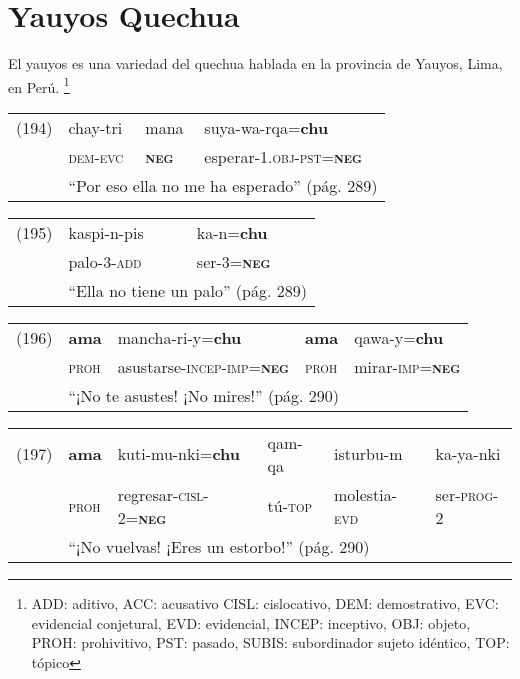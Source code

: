 \section*{Yauyos Quechua}

\noindent El yauyos es una variedad del quechua hablada en la provincia de Yauyos, Lima, en Perú.
\footnote{ADD: aditivo, ACC: acusativo CISL: cislocativo, DEM: demostrativo, EVC: evidencial conjetural, EVD: evidencial, INCEP: inceptivo, OBJ: objeto, PROH: prohivitivo, PST: pasado, SUBIS: subordinador sujeto idéntico, TOP: tópico}
\vspace{0.1cm}

{\setmainfont{Charis SIL}

\noindent \begin{tabular}{llll}
(194) & chay-tri & mana & suya-wa-rqa=\textbf{chu} \\
& \textsc{dem-evc} & \textsc{\textbf{neg}} & esperar-\textsc{1.obj-pst=\textbf{neg}} \\
& \multicolumn{3}{l}{``Por eso ella no me ha esperado'' (pág. 289)}
\end{tabular} \vspace{0.1cm}

\noindent \begin{tabular}{lll}
(195) & kaspi-n-pis & ka-n=\textbf{chu} \\
& palo-\textsc{3-add} & ser-\textsc{3=\textbf{neg}}\\
& \multicolumn{2}{l}{``Ella no tiene un palo'' (pág. 289)}
\end{tabular} \vspace{0.1cm}

\noindent \begin{tabular}{lllll}
(196) & \textbf{ama} & mancha-ri-y=\textbf{chu} & \textbf{ama} & qawa-y=\textbf{chu} \\
& \textsc{proh} & asustarse-\textsc{incep-imp=\textbf{neg}} & \textsc{proh} & mirar-\textsc{imp=\textbf{neg}} \\
& \multicolumn{4}{l}{``¡No te asustes! ¡No mires!'' (pág. 290)}
\end{tabular} \vspace{0.1cm}

\noindent \begin{tabular}{llllll}
(197) & \textbf{ama} & kuti-mu-nki=\textbf{chu} & qam-qa & isturbu-m & ka-ya-nki \\
& \textsc{proh} & regresar-\textsc{cisl-2=\textbf{neg}} & tú-\textsc{top} & molestia-\textsc{evd} & ser-\textsc{prog-2} \\
& \multicolumn{5}{l}{``¡No vuelvas! ¡Eres un estorbo!'' (pág. 290)}
\end{tabular} \vspace{0.1cm}

}
